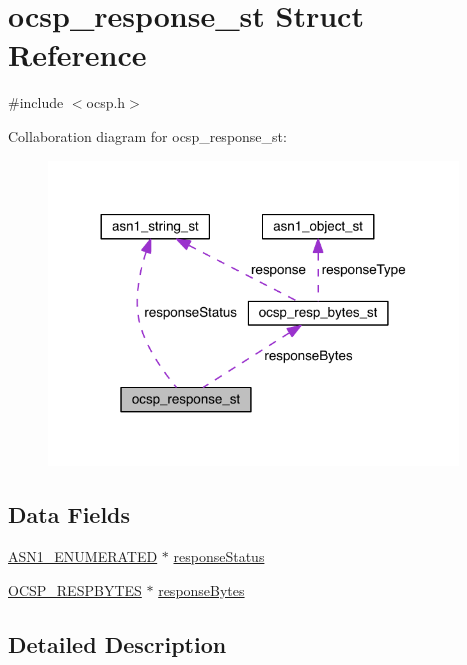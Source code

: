 \hypertarget{structocsp__response__st}{}\section{ocsp\+\_\+response\+\_\+st Struct Reference}
\label{structocsp__response__st}


{\ttfamily \#include $<$ocsp.\+h$>$}



Collaboration diagram for ocsp\+\_\+response\+\_\+st\+:\nopagebreak
\begin{figure}[H]
\begin{center}
\leavevmode
\includegraphics[width=308pt]{structocsp__response__st__coll__graph}
\end{center}
\end{figure}
\subsection*{Data Fields}
\begin{DoxyCompactItemize}
\item 
\hyperlink{crypto_2ossl__typ_8h_a4b87b1c33899eb49377f298e8a8b9850}{A\+S\+N1\+\_\+\+E\+N\+U\+M\+E\+R\+A\+T\+ED} $\ast$ \hyperlink{structocsp__response__st_ac6a542c0f43468e58bf47bc6ff99aea8}{response\+Status}
\item 
\hyperlink{crypto_2ocsp_2ocsp_8h_a46460429b9fa827a0e5529227acbcd22}{O\+C\+S\+P\+\_\+\+R\+E\+S\+P\+B\+Y\+T\+ES} $\ast$ \hyperlink{structocsp__response__st_a26025eb656186d36170480f1c9c782dc}{response\+Bytes}
\end{DoxyCompactItemize}


\subsection{Detailed Description}


